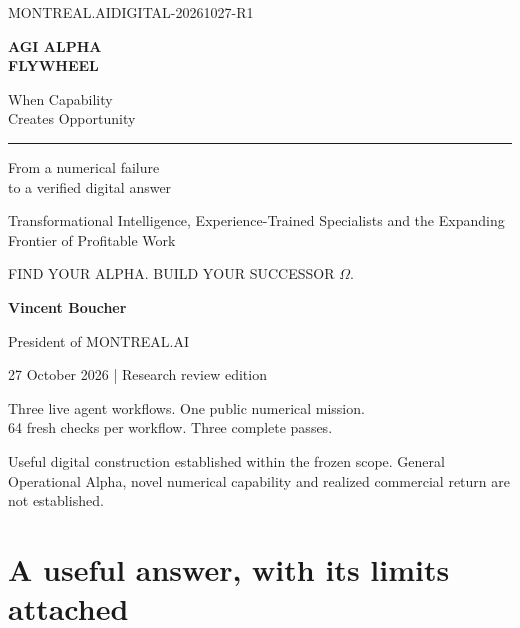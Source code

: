 \documentclass[
  10pt,
]{article}
\subtitle{From a numerical failure to a verified digital answer}
\author{}
\date{}
\begin{document}
\begin{titlepage}
\pagecolor{DeepPurple}\color{white}
\vspace*{0.45in}
{\sffamily\small MONTREAL.AI\hfill DIGITAL-20261027-R1\par}
\vspace{0.85in}
{\sffamily\fontsize{35}{40}\selectfont\bfseries AGI ALPHA\\FLYWHEEL\par}
\vspace{0.24in}
{\sffamily\fontsize{23}{29}\selectfont When Capability\\Creates Opportunity\par}
\vspace{0.42in}
{\color{white!70}\rule{0.9\linewidth}{0.7pt}\par}
\vspace{0.25in}
{\sffamily\fontsize{18}{24}\selectfont From a numerical failure\\to a verified digital answer\par}
\vspace{0.25in}
{\large Transformational Intelligence, Experience-Trained Specialists and the Expanding Frontier of Profitable Work\par}
\vfill
{\sffamily\small FIND YOUR ALPHA. BUILD YOUR SUCCESSOR $\Omega$.\par}\vspace{0.25in}
{\sffamily\bfseries Vincent Boucher\par}
{\sffamily President of MONTREAL.AI\par}
\vspace{0.3in}
{\sffamily\small 27 October 2026 | Research review edition\par}
\vspace{0.2in}
{\small Three live agent workflows. One public numerical mission.\\64 fresh checks per workflow. Three complete passes.\par}
\vspace{0.15in}
{\footnotesize Useful digital construction established within the frozen scope. General Operational Alpha, novel numerical capability and realized commercial return are not established.\par}
\end{titlepage}
\nopagecolor\color{Ink}\setcounter{page}{1}

\hypertarget{a-useful-answer-with-its-limits-attached}{%
\section{A useful answer, with its limits
attached}\label{a-useful-answer-with-its-limits-attached}}
\end{document}
